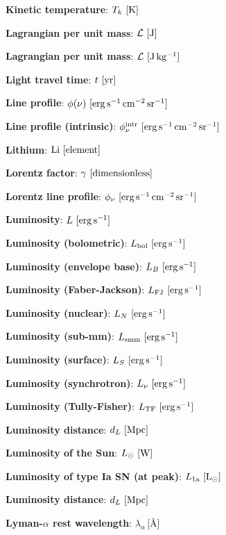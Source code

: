 \documentclass[a4paper,10pt]{article}
\begin{document}
{\noindent}\textbf{Kinetic temperature}: $T_k ~ [{\rm K}]$

{\noindent}\textbf{Lagrangian per unit mass}: $\mathcal{L} ~ [{\rm J}]$

{\noindent}\textbf{Lagrangian per unit mass}: $\mathcal{L} ~ [{\rm J\,kg^{-1}}]$

{\noindent}\textbf{Light travel time}: $t ~ [{\rm yr}]$

{\noindent}\textbf{Line profile}: $\phi(\nu) ~ [{\rm erg\,s^{-1}\,cm^{-2}\,sr^{-1}}]$

{\noindent}\textbf{Line profile (intrinsic)}: $\phi_\nu^{\rm intr} ~ [{\rm erg\,s^{-1}\,cm^{-2}\,sr^{-1}}]$

{\noindent}\textbf{Lithium}: ${\rm Li} ~ [{\rm element}]$

{\noindent}\textbf{Lorentz factor}: $\gamma ~ [{\rm dimensionless}]$

{\noindent}\textbf{Lorentz line profile}: $\phi_\nu ~ [{\rm erg\,s^{-1}\,cm^{-2}\,sr^{-1}}]$

{\noindent}\textbf{Luminosity}: $L ~ [{\rm erg\,s^{-1}}]$

{\noindent}\textbf{Luminosity (bolometric)}: $L_{\rm bol} ~ [{\rm erg\,s^{-1}}]$

{\noindent}\textbf{Luminosity (envelope base)}: $L_B ~ [{\rm erg\,s^{-1}}]$

{\noindent}\textbf{Luminosity (Faber-Jackson)}: $L_\mathrm{FJ} ~ [{\rm erg\,s^{-1}}]$

{\noindent}\textbf{Luminosity (nuclear)}: $L_N ~ [{\rm erg\,s^{-1}}]$

{\noindent}\textbf{Luminosity (sub-mm)}: $L_{\rm smm} ~ [{\rm erg\,s^{-1}}]$

{\noindent}\textbf{Luminosity (surface)}: $L_S ~ [{\rm erg\,s^{-1}}]$

{\noindent}\textbf{Luminosity (synchrotron)}: $L_\nu ~ [{\rm erg\,s^{-1}}]$

{\noindent}\textbf{Luminosity (Tully-Fisher)}: $L_\mathrm{TF} ~ [{\rm erg\,s^{-1}}]$

{\noindent}\textbf{Luminosity distance}: $d_L ~ [{\rm Mpc}]$

{\noindent}\textbf{Luminosity of the Sun}: $L_\odot ~ [{\rm W}]$

{\noindent}\textbf{Luminosity of type Ia SN (at peak)}: $L_\mathrm{1a} ~ [{\rm L_\odot}]$

{\noindent}\textbf{Luminosity distance}: $d_L ~ [{\rm Mpc}]$

{\noindent}\textbf{Lyman-$\alpha$ rest wavelength}: $\lambda_\alpha$\,[\AA]
\end{document}
